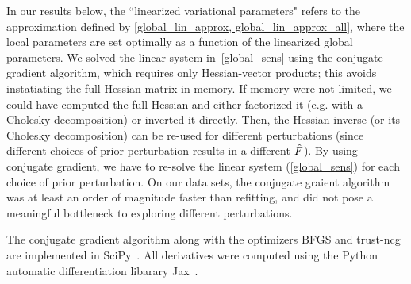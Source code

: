 In our results below, the ``linearized variational parameters" refers to
the approximation defined by \eqref{global_lin_approx, global_lin_approx_all},
where the local parameters are set optimally as a function of the linearized global parameters. 
We solved the linear system in~\eqref{global_sens} using
the conjugate gradient algorithm, which requires only Hessian-vector products;
this avoids instatiating the full Hessian matrix in memory.
If memory were not limited,
we could have computed the full Hessian and
either factorized it (e.g. with a Cholesky decomposition) or inverted it directly.
Then, the Hessian inverse (or its Cholesky decomposition) can
be re-used for different perturbations
(since different choices of prior perturbation
results in a different $\hat F$).
By using conjugate gradient, we have to re-solve the linear system (\eqref{global_sens})
for each choice of prior perturbation.
On our data sets, the conjugate graient algorithm was at least
an order of magnitude faster than refitting, and did not pose a meaningful bottleneck
to exploring different perturbations.

The conjugate gradient algorithm along with the optimizers BFGS and trust-ncg
are implemented in SciPy~\citep{scipy}.
All derivatives were computed using the Python
automatic differentiation libarary Jax~\citep{jax2018github}.



